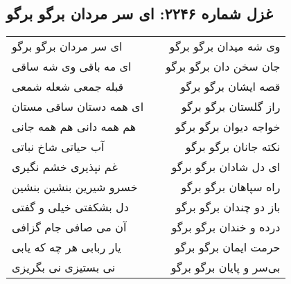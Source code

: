 \begin{center}
\section*{غزل شماره ۲۲۴۶: ای سر مردان برگو برگو}
\label{sec:2246}
\begin{longtable}{l p{0.5cm} r}
ای سر مردان برگو برگو
&&
وی شه میدان برگو برگو
\\
ای مه باقی وی شه ساقی
&&
جان سخن دان برگو برگو
\\
قبله جمعی شعله شمعی
&&
قصه ایشان برگو برگو
\\
ای همه دستان ساقی مستان
&&
راز گلستان برگو برگو
\\
هم همه دانی هم همه جانی
&&
خواجه دیوان برگو برگو
\\
آب حیاتی شاخ نباتی
&&
نکته جانان برگو برگو
\\
غم نپذیری خشم نگیری
&&
ای دل شادان برگو برگو
\\
خسرو شیرین بنشین بنشین
&&
راه سپاهان برگو برگو
\\
دل بشکفتی خیلی و گفتی
&&
باز دو چندان برگو برگو
\\
آن می صافی جام گزافی
&&
درده و خندان برگو برگو
\\
یار ربابی هر چه که یابی
&&
حرمت ایمان برگو برگو
\\
نی بستیزی نی بگریزی
&&
بی‌سر و پایان برگو برگو
\\
\end{longtable}
\end{center}
